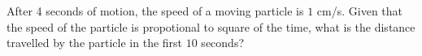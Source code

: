 
%
%
%
%
% 
% 

\question After 4 seconds of motion, the speed of a moving particle is $1$ cm/s. 
Given that the speed of the particle is propotional to square of the time, what is
the distance travelled by the particle in the first $10$ seconds?

\insertQR{}

\ifprintanswers
\fi 

